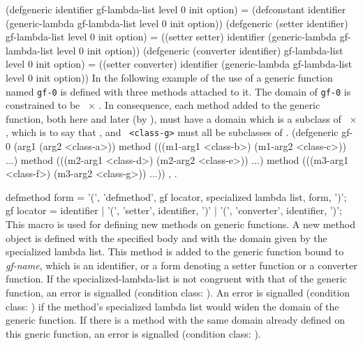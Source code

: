 \begin{optDefinition}
\savesyntax{}\vbox{\syntax
(defgeneric identifier
  gf-lambda-list {level 0 init option})
   = (defconstant identifier
       (generic-lambda
         gf-lambda-list {level 0 init option}))
(defgeneric (setter identifier)
  gf-lambda-list {level 0 init option})
   = ((setter setter) identifier
       (generic-lambda
         gf-lambda-list {level 0 init option}))
(defgeneric (converter identifier)
  gf-lambda-list {level 0 init option})
   = ((setter converter) identifier
       (generic-lambda
         gf-lambda-list {level 0 init option}))
\endsyntax}
\label{defgeneric-rewrite-rules}
%
\examples
In the following example of the use of  a generic
function named {\tt gf-0} is defined with three methods attached to
it.  The domain of {\tt gf-0} is constrained to be \
$\times$ {\tt <class-a>}.  In consequence, each method added to the
generic function, both here and later (by \macroref{defmethod}), must have
a domain which is a subclass of \classref{object}\ $\times$ {\tt <class-a>},
which is to say that {\tt <class-c>}, {\tt <class-e>} and {\tt
<class-g>} must all be subclasses of {\tt <class-a>}.
%
{\syntax
(defgeneric gf-0 (arg1 (arg2 <class-a>))
  method (((m1-arg1 <class-b>) (m1-arg2 <class-c>)) ...)
  method (((m2-arg1 <class-d>) (m2-arg2 <class-e>)) ...)
  method (((m3-arg1 <class-f>) (m3-arg2 <class-g>)) ...))
\endsyntax}
%
\seealso%
, .

\Syntax
\savesyntax{}\vbox{\syntax
defmethod form
   = '(', 'defmethod', gf locator,
     specialized lambda list,
     {form}, ')';
gf locator
   = identifier
   | '(', 'setter', identifier, ')'
   | '(', 'converter', identifier, ')';
\endsyntax}
%
\remarks%
This macro is used for defining new methods on generic functions.  A new method
object is defined with the specified body and with the domain given by the
specialized lambda list.  This method is added to the generic function bound to
{\em gf-name\/}, which is an identifier, or a form denoting a setter function or
a converter function. If the specialized-lambda-list is not congruent with that
of the generic function, an error is signalled (condition class:
\conditionref{non-congruent-lambda-lists}).
An error is signalled (condition class:
)
if the method's specialized lambda list would widen the domain of the generic
function.  If there is a method with the same domain already defined on this
gneric function, an error is signalled (condition class:
).


\end{optDefinition}
